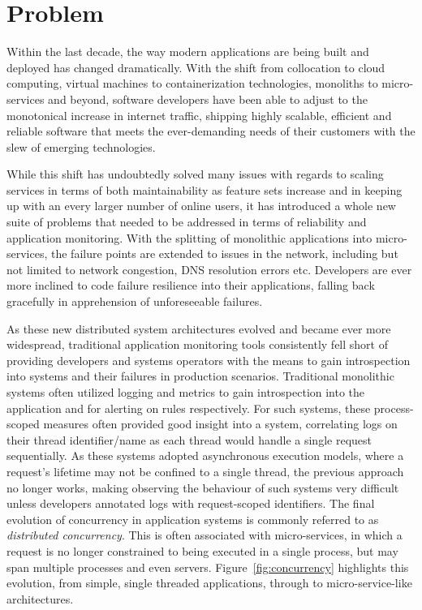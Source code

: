 \documentclass[12pt,pdftex,titlepage]{report}
\begin{document}
        \section{Problem}
            Within the last decade, the way modern applications are being built and deployed has changed dramatically. With the shift from collocation to cloud computing,
            virtual machines to containerization technologies, monoliths to micro-services and beyond, software developers have been able to adjust to 
            the monotonical increase in internet traffic, shipping highly scalable, efficient and reliable software that meets the ever-demanding needs of their customers
            with the slew of emerging technologies.

            While this shift has undoubtedly solved many issues with regards to scaling services in terms of both maintainability as feature sets increase and in keeping up
            with an every larger number of online users, it has introduced a whole new suite of problems that needed to be addressed in terms of reliability and application 
            monitoring. With the splitting of monolithic applications into micro-services, the failure points are extended to issues in the network, including but not limited
            to network congestion, DNS resolution errors etc. Developers are ever more inclined to code failure resilience into their applications, falling back gracefully in 
            apprehension of unforeseeable failures.

            As these new distributed system architectures evolved and became ever more widespread, traditional application monitoring tools consistently fell short of providing
            developers and systems operators with the means to gain introspection into systems and their failures in production scenarios\cite{retrospective}. Traditional monolithic systems often
            utilized logging and metrics to gain introspection into the application and for alerting on rules respectively. For such systems, these process-scoped measures often 
            provided good insight into a system, correlating logs on their thread identifier/name as each thread would handle a single request sequentially. As these systems 
            adopted asynchronous execution models, where a request's lifetime may not be confined to a single thread, the previous approach no longer works, making observing
            the behaviour of such systems very difficult unless developers annotated logs with request-scoped identifiers. The final evolution of concurrency in application systems is
            commonly referred to as \textit{distributed concurrency}. This is often associated with micro-services, in which a request is no longer constrained to being executed
            in a single process, but may span multiple processes and even servers. Figure~\ref{fig:concurrency} highlights this evolution, from simple, single threaded applications,
            through to micro-service-like architectures.
\end{document}
